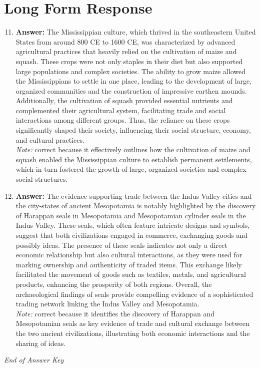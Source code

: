 \documentclass[12pt]{article}
\begin{document}
\section*{Long Form Response}
\begin{enumerate}[label=\arabic*.]
\setcounter{enumi}{10}
\item \textbf{Answer:} The Mississippian culture, which thrived in the southeastern United States from around 800 CE to 1600 CE, was characterized by advanced agricultural practices that heavily relied on the cultivation of maize and squash. These crops were not only staples in their diet but also supported large populations and complex societies. The ability to grow maize allowed the Mississippians to settle in one place, leading to the development of large, organized communities and the construction of impressive earthen mounds. Additionally, the cultivation of squash provided essential nutrients and complemented their agricultural system, facilitating trade and social interactions among different groups. Thus, the reliance on these crops significantly shaped their society, influencing their social structure, economy, and cultural practices.
\\ \textit{Note:} correct because it effectively outlines how the cultivation of maize and squash enabled the Mississippian culture to establish permanent settlements, which in turn fostered the growth of large, organized societies and complex social structures.
\item \textbf{Answer:} The evidence supporting trade between the Indus Valley cities and the city-states of ancient Mesopotamia is notably highlighted by the discovery of Harappan seals in Mesopotamia and Mesopotamian cylinder seals in the Indus Valley. These seals, which often feature intricate designs and symbols, suggest that both civilizations engaged in commerce, exchanging goods and possibly ideas. The presence of these seals indicates not only a direct economic relationship but also cultural interactions, as they were used for marking ownership and authenticity of traded items. This exchange likely facilitated the movement of goods such as textiles, metals, and agricultural products, enhancing the prosperity of both regions. Overall, the archaeological findings of seals provide compelling evidence of a sophisticated trading network linking the Indus Valley and Mesopotamia.
\\ \textit{Note:} correct because it identifies the discovery of Harappan and Mesopotamian seals as key evidence of trade and cultural exchange between the two ancient civilizations, illustrating both economic interactions and the sharing of ideas.
\end{enumerate}

\vfill
\noindent\textit{End of Answer Key}
\end{document}
